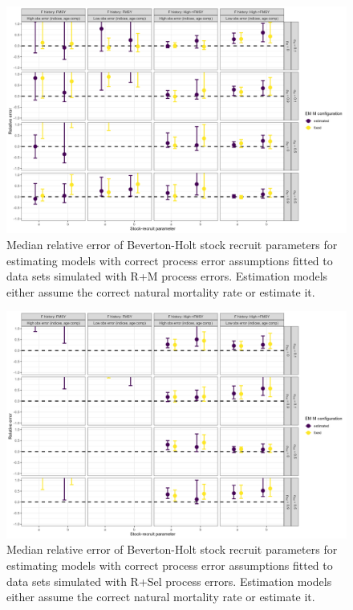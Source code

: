 \documentclass[
  12pt,
]{article}
\begin{document}
\begin{landscape}
\begin{figure}
\caption{Median relative error of Beverton-Holt stock recruit parameters for estimating models with correct process error assumptions fitted to data sets simulated with R+M process errors. Estimation models either assume the correct natural mortality rate or estimate it.}\label{M_om_SR_relbias}
\begin{center}
\includegraphics[width = \textwidth]{M_om_SR_relerror.png}
\end{center}
\end{figure}
\end{landscape}

\begin{landscape}
\begin{figure}
\caption{Median relative error of Beverton-Holt stock recruit parameters for estimating models with correct process error assumptions fitted to data sets simulated with R+Sel process errors. Estimation models either assume the correct natural mortality rate or estimate it.}\label{Sel_om_SR_relbias}
\begin{center}
\includegraphics[width = \textwidth]{Sel_om_SR_relerror.png}
\end{center}
\end{figure}
\end{landscape}
\end{document}
